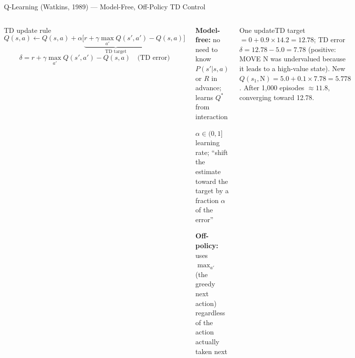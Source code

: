 \documentclass[aspectratio=169,10pt,t]{beamer}
\begin{document}
\begin{frame}{Q-Learning (Watkins, 1989) --- Model-Free, Off-Policy TD Control}
\begin{columns}[T]
\begin{fbx}{TD update rule}\[Q(s,a)\leftarrow Q(s,a)+\alpha\big[\underbrace{r+\gamma\max_{a'}Q(s',a')}_{\text{TD target}}-Q(s,a)\big]\]\[\delta=r+\gamma\max_{a'}Q(s',a')-Q(s,a)\quad\text{(TD error)}\]\end{fbx}
\begin{tl}\item \textbf{Model-free:} no need to know $P(s'|s,a)$ or $R$ in advance; learns $Q^{*}$ from interaction\item $\alpha\in(0,1]$ learning rate; ``shift the estimate toward the target by a fraction $\alpha$ of the error''\item \textbf{Off-policy:} uses $\max_{a'}$ (the greedy next action) regardless of the action actually taken next\end{tl}
\begin{cbox}[ISSAgrn]{One update}\scriptsize TD target $=0+0.9\times14.2=12.78$; TD error $\delta=12.78-5.0=7.78$ (positive: MOVE N was undervalued because it leads to a high-value state). New $Q(s_1,\text{N})=5.0+0.1\times7.78=\mathbf{5.778}$. After 1,000 episodes $\approx11.8$, converging toward 12.78.\end{cbox}
\end{columns}
\end{frame}
\end{document}
